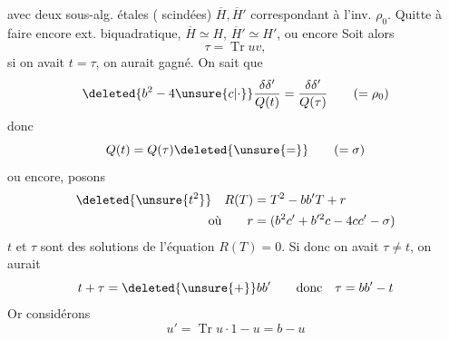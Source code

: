  avec deux sous-alg. étales ( scindées) $\overline H,\overline H'$ correspondant à l'inv. $\rho_0$. Quitte à faire encore ext. biquadratique,  $\overline H\simeq H$, $\overline H'\simeq H'$, ou encore   Soit alors
\[
\tau=\operatorname{Tr}uv,
\]
si on avait $t=\tau$, on aurait gagné. On sait que
\[
\deleted{b^2-4\unsure{c|\cdot}}\frac{\delta\delta'}{Q(t)}=\frac{\delta\delta'}{Q(\tau)}\qquad(=\rho_0)
\]
donc
\[
Q(t)=Q(\tau)\deleted{\unsure{=}}\qquad(=\sigma)
\]
 ou encore, posons 
\[
\begin{aligned}
\deleted{\unsure{t^2}}\quad R(T)&=T^2-bb'T+r\\ \text{où}\qquad r&=(b^2c'+b'^2c-4cc'-\sigma)
\end{aligned}
\]
$t$ et $\tau$ sont des solutions de l'équation $R(T)=0$. Si donc on avait $\tau\ne t$, on aurait
\[
t+\tau=\deleted{\unsure{+}}bb'\qquad\text{donc}\quad\tau=bb'-t
\]
Or considérons
\[
u'=\operatorname{Tr}u\cdot1-u=b-u
\]
